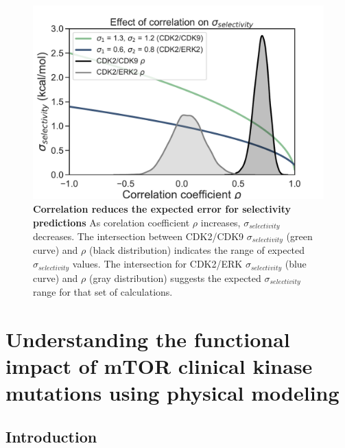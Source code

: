 \documentclass[phd,tocprelim]{cornell}
\begin{document}
\begin{landscape}
\begin{figure}[p]
\centering
\includegraphics[width=0.8\linewidth]{figures/supp_figure3.pdf}
\caption[Correlation reduces the expected error for selectivity predictions]{
{\bf Correlation reduces the expected error for selectivity predictions}
As corelation coefficient $\rho$ increases, $\sigma_{selectivity}$ decreases. The intersection between CDK2/CDK9 $\sigma_{selectivity}$ (green curve) and $\rho$ (black distribution) indicates the range of expected $\sigma_{selectivity}$ values. The intersection for CDK2/ERK $\sigma_{selectivity}$ (blue curve) and $\rho$ (gray distribution) suggests the expected $\sigma_{selectivity}$ range for that set of calculations. 
}
\label{fig:sup-figure-3}
\end{figure}
\end{landscape}

\chapter{Understanding the functional impact of mTOR clinical kinase mutations using physical modeling}

\section{Introduction}
\end{document}
